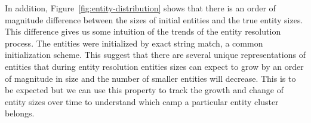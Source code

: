 In addition, Figure~\ref{fig:entity-distribution} shows that there is an
order of magnitude difference between the sizes of initial entities and the
true entity sizes.
This difference gives us some intuition of the trends of the entity resolution process.
The entities were initialized by exact string match, a common initialization scheme.
This suggest that there are several unique representations
of entities that during entity resolution entities sizes can expect to grow 
by an order of magnitude in size and the number of smaller entities will decrease.
This is to be expected but we can use this property to track the growth and
change of entity sizes over time to understand which camp a particular entity
cluster belongs. 



